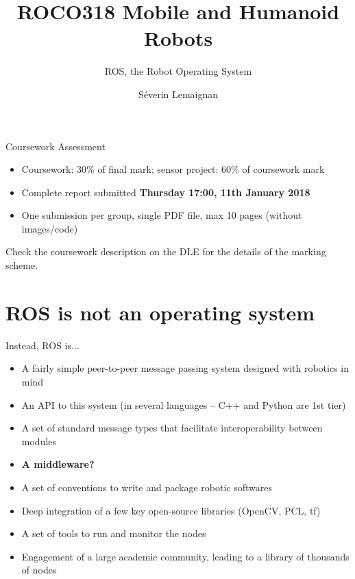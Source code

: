 \documentclass[compress]{beamer}
\title{ROCO318 \newline Mobile and Humanoid Robots}
\subtitle{ROS, the Robot Operating System}
\date{}
\author{Séverin Lemaignan}
\institute{Centre for Neural Systems and Robotics\\{\bf Plymouth University}}
\makeatletter
\let\beamer@writeslidentry@miniframeson=\beamer@writeslidentry
\def\beamer@writeslidentry@miniframesoff{%
  \expandafter\beamer@ifempty\expandafter{\beamer@framestartpage}{}%
  {%
    \clearpage\beamer@notesactions%
  }
}
\newcommand*{\miniframeson}{\let\beamer@writeslidentry=\beamer@writeslidentry@miniframeson}
\newcommand*{\miniframesoff}{\let\beamer@writeslidentry=\beamer@writeslidentry@miniframesoff}
\makeatother
\begin{document}

\maketitle

\miniframesoff
\begin{frame}{Coursework Assessment}

    \begin{itemize}
        \item Coursework: 30\% of final mark; sensor project: 60\% of coursework
            mark
        \item Complete report submitted \textbf{Thursday 17:00, 11th January 2018}
        \item One submission per group, single PDF file, max 10 pages (without
            images/code)
    \end{itemize}

    \pause

    Check the coursework description on the DLE for the details of the marking
    scheme.
\end{frame}

\miniframeson

\section[Intro]{ROS is not an operating system}

\begin{frame}{Instead, ROS is...}
    \begin{itemize}
        \item<1-> A fairly simple peer-to-peer message passing system designed with robotics in
            mind
        \item<2-> An API to this system (in several languages -- C++ and Python are
            1st tier)
        \item<3-> A set of standard message types that facilitate interoperability between modules
        \item<4> \bf{A middleware?}
        \item<5-> A set of conventions to write and package robotic softwares
        \item<6-> Deep integration of a few key open-source libraries (OpenCV, PCL, tf)
        \item<7-> A set of tools to run and monitor the nodes
        \item<8-> Engagement of a large academic community, leading to a library of thousands of nodes
    \end{itemize}
\end{frame}
\end{document}
